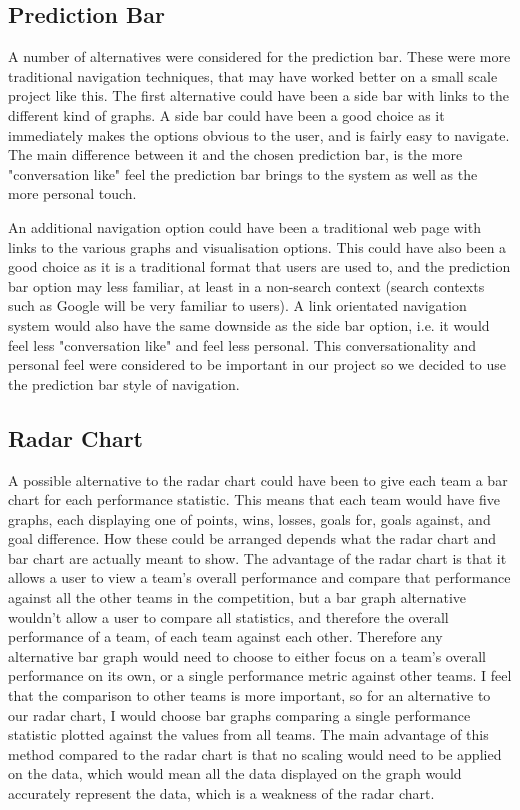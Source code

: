 \documentclass[10pt, journal]{IEEEtran}
\begin{document}
\subsection{Prediction Bar}
A number of alternatives were considered for the prediction bar. These were more traditional navigation techniques, that may have worked better on a small scale project like this. The first alternative could have been a side bar with links to the different kind of graphs. A side bar could have been a good choice as it immediately makes the options obvious to the user, and is fairly easy to navigate. The main difference between it and the chosen prediction bar, is the more "conversation like" feel the prediction bar brings to the system as well as the more personal touch.

An additional navigation option could have been a traditional web page with links to the various graphs and visualisation options. This could have also been a good choice as it is a traditional format that users are used to, and the prediction bar option may less familiar, at least in a non-search context (search contexts such as Google will be very familiar to users). A link orientated navigation system would also have the same downside as the side bar option, i.e. it would feel less "conversation like" and feel less personal. This conversationality and personal feel were considered to be important in our project so we decided to use the prediction bar style of navigation.

\subsection{Radar Chart}
A possible alternative to the radar chart could have been to give each team a bar chart for each performance statistic. This means that each team would have five graphs, each displaying one of points, wins, losses, goals for, goals against, and goal difference. How these could be arranged depends what the radar chart and bar chart are actually meant to show. The advantage of the radar chart is that it allows a user to view a team's overall performance and compare that performance against all the other teams in the competition, but a bar graph alternative wouldn't allow a user to compare all statistics, and therefore the overall performance of a team, of each team against each other. Therefore any alternative bar graph would need to choose to either focus on a team's overall performance on its own, or a single performance metric against other teams. I feel that the comparison to other teams is more important, so for an alternative to our radar chart, I would choose bar graphs comparing a single performance statistic plotted against the values from all teams. The main advantage of this method compared to the radar chart is that no scaling would need to be applied on the data, which would mean all the data displayed on the graph would accurately represent the data, which is a weakness of the radar chart.
\end{document}

